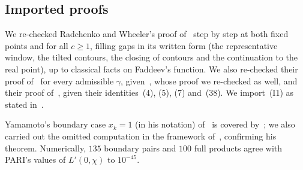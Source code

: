 \documentclass[11pt]{amsart}
\numberwithin{equation}{section}
\theoremstyle{plain}
\theoremstyle{definition}
\theoremstyle{remark}
\begin{document}
\subsection*{Imported proofs}
We re-checked Radchenko and Wheeler's proof of~\cite[(6)]{RW} step by step at both fixed points and for all $c\ge1$, filling gaps in its written form (the representative window, the tilted contours, the closing of contours and the continuation to the real point), up to classical facts on Faddeev's function. We also re-checked their proof of~\cite[(7)]{RW} for every admissible $\gamma$, given~\cite[Thm.~3, (23)]{RW}, whose proof we re-checked as well, and their proof of~\cite[Thm.~7]{RW}, given their identities~(4), (5), (7) and~(38). We import~(I1) as stated in~\cite{RW}.

Yamamoto's boundary case $x_k=1$ (in his notation) of~\cite[Thm.~5.1.1]{Ya08} is covered by~\cite[Thms.~3.5, 4.10]{Ya10}; we also carried out the omitted computation in the framework of~\cite{Ya08}, confirming his theorem. Numerically, $135$ boundary pairs and $100$ full products agree with PARI's values of $L'(0,\chi)$ to $10^{-45}$.
\end{document}
